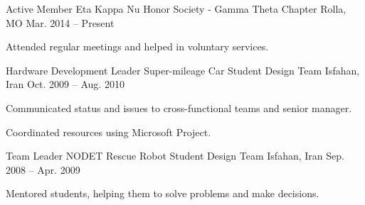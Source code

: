 \begin{cventries}
  \cventry
    {Active Member}
    {Eta Kappa Nu Honor Society - Gamma Theta Chapter}
    {Rolla, MO}
    {Mar. 2014 -- Present}
    {
      \begin{cvitems}
        \item Attended regular meetings and helped in voluntary services.
      \end{cvitems}
    }
  \cventry
    {Hardware Development Leader}
    {Super-mileage Car Student Design Team}
    {Isfahan, Iran}
    {Oct. 2009 -- Aug. 2010}
    {
      \begin{cvitems}
        \item Communicated status and issues to cross-functional teams and senior manager.
        \item Coordinated resources using Microsoft Project.
      \end{cvitems}
    }
  \cventry
    {Team Leader}
    {NODET Rescue Robot Student Design Team}
    {Isfahan, Iran}
    {Sep. 2008 -- Apr. 2009}
    {
      \begin{cvitems}
        \item Mentored students, helping them to solve problems and make decisions.
      \end{cvitems}
    }
\end{cventries}